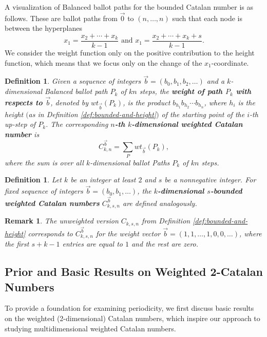 \documentclass[12pt,notitlepage]{amsart}
\numberwithin{equation}{section}
\theoremstyle{thmstyleone}%
\theoremstyle{thmstyletwo}%
\newtheorem{remark}[theorem]{Remark}%
\theoremstyle{thmstylethree}%
\newtheorem{definition}[theorem]{Definition}%
\numberwithin{theorem}{section}
\numberwithin{equation}{section}
\begin{document}
A visualization of Balanced ballot paths for the bounded Catalan number is as follows. These are ballot paths from $\vec{0}$ to $(n,\ldots ,n)$ such that each node is between the hyperplanes $$ x_1 = \frac{x_2 + \cdots + x_k}{k-1} \mbox{ and } x_1 = \frac{x_2 + \cdots + x_k + s}{k-1}. $$ 
We consider the weight function only on the positive contribution to the height function, which means that we focus only on the change of the $x_1$-coordinate. 
\begin{definition}
\label{defn:weightedkdim}
    Given a sequence of integers $\vec{b} =(b_0,b_1,b_2,\ldots)$ and a $k$-dimensional Balanced ballot path $P_k$ of $kn$ steps, the \textbf{weight of path $P_k$ with respects to $\vec{b}$}, denoted by $wt_{\vec{b}}(P_k)$, is the product $b_{h_1} b_{h_2} \cdots b_{h_n}$, where $h_i$ is the height $($as in Definition \ref{def:bounded-and-height}$)$ of the starting point of the $i$-th up-step of $P_k$. The corresponding \textbf{$n$-th $k$-dimensional weighted Catalan number} is  $$C_{k,n}^{\vec{b}} = \sum_P wt_{\vec{b}}(P_k),$$
    where the sum is over all $k$-dimensional ballot Paths $P_k$ of $kn$ steps.

    
\end{definition}

\begin{definition}
\label{defn:k-dims-boundCat}
    Let $k$ be an integer at least $2$ and $s$ be a nonnegative integer. For fixed sequence of integers $\vec{b} =(b_0,b_1,\ldots)$, the \textbf{$k$-dimensional $s$-bounded weighted Catalan numbers} $C^{\vec{b}}_{k,s,n}$ are defined analogously.
\end{definition}

\begin{remark}
    The unweighted version $C_{k,s,n}$ from Definition \ref{def:bounded-and-height} corresponds to $C^{\vec{b}}_{k,s,n}$ for the weight vector $\vec{b} = (1,1,\ldots,1,0,0,\ldots)$, where the first $s+k-1$ entries are equal to $1$ and the rest are zero. 
\end{remark}


\subsection{Prior and Basic Results on Weighted 2-Catalan Numbers}
To provide a foundation for examining periodicity, we first discuss basic results on the weighted (2-dimensional) Catalan numbers, which inspire our approach to studying multidimensional weighted Catalan numbers.
\end{document}
